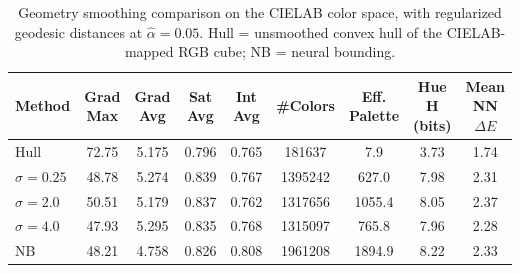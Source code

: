 \begin{table}[H]
\small
\begin{tabular}{@{}lcccccccc@{}}
\toprule
\textbf{Method} & \textbf{Grad Max} & \textbf{Grad Avg} & \textbf{Sat Avg} & \textbf{Int Avg} & \textbf{\#Colors} & \textbf{Eff. Palette} & \textbf{Hue H (bits)} & \textbf{Mean NN $\Delta E$}\\
\midrule
Hull & 72.75 & 5.175 & 0.796 & 0.765 & 181637 & 7.9 & 3.73 & 1.74\\
$\sigma=0.25$ & 48.78 & 5.274 & 0.839 & 0.767 & 1395242 & 627.0 & 7.98 & 2.31\\
$\sigma=2.0$ & 50.51 & 5.179 & 0.837 & 0.762 & 1317656 & 1055.4 & 8.05 & 2.37\\
$\sigma=4.0$ & 47.93 & 5.295 & 0.835 & 0.768 & 1315097 & 765.8 & 7.96 & 2.28\\
NB & 48.21 & 4.758 & 0.826 & 0.808 & 1961208 & 1894.9 & 8.22 & 2.33\\
\bottomrule
\end{tabular}
\caption{Geometry smoothing comparison on the CIELAB color space, with regularized geodesic distances at $\hat{\alpha}=0.05$. Hull = unsmoothed convex hull of the CIELAB-mapped RGB cube; NB = neural bounding.}
\label{tab:geometry_smoothing_comparison}
\end{table}
